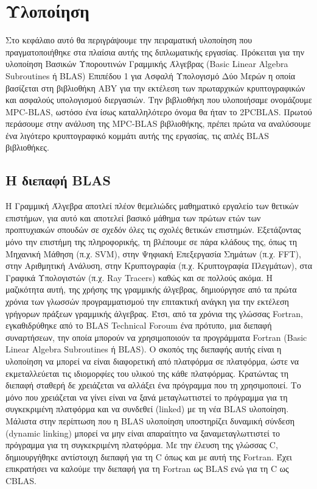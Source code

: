 \chapter{Υλοποίηση}
\label{chapter:implementation}

Στο κεφάλαιο αυτό θα περιγράψουμε την πειραματική υλοποίηση που πραγματοποιήθηκε στα πλαίσια αυτής της διπλωματικής εργασίας. Πρόκειται για την υλοποίηση Βασικών Υπορουτινών Γραμμικής Άλγεβρας (Basic Linear Algebra Subroutines ή BLAS) Επιπέδου 1 για Ασφαλή Υπολογισμό Δύο Μερών η οποία βασίζεται στη βιβλιοθήκη ABY για την εκτέλεση των πρωταρχικών κρυπτογραφικών και ασφαλούς υπολογισμού διεργασιών. Την βιβλιοθήκη που υλοποιήσαμε ονομάζουμε MPC-BLAS, ωστόσο ένα ίσως καταλληλότερο όνομα θα ήταν το 2PCBLAS. Πρωτού περάσουμε στην ανάλυση της MPC-BLAS βιβλιοθήκης, πρέπει πρώτα να αναλύσουμε ένα λιγότερο κρυπτογραφικό κομμάτι αυτής της εργασίας, τις απλές BLAS βιβλιοθήκες.


\section{Η διεπαφή BLAS}

Η Γραμμική Άλγεβρα αποτλεί πλέον θεμελιώδες μαθηματικό εργαλείο των θετικών επιστήμων, για αυτό και αποτελεί βασικό μάθημα των πρώτων ετών των προπτυχιακών σπουδών σε σχεδόν όλες τις σχολές θετικών επιστημών. Εξετάζοντας μόνο την επιστήμη της πληροφορικής, τη βλέπουμε σε πάρα κλάδους της, όπως τη Μηχανική Μάθηση (π.χ. SVM), στην Ψηφιακή Επεξεργασία Σημάτων (π.χ. FFT), στην Αριθμητική Ανάλυση, στην Κρυπτογραφία (π.χ. Κρυπτογραφία Πλεγμάτων), στα Γραφικά Υπολογιστών (π.χ. Ray Tracers) καθώς και σε πολλούς ακόμα.
Η μαζικότητα αυτή, της χρήσης της γραμμικής άλγεβρας, δημιούργησε από τα πρώτα χρόνια των γλωσσών προγραμματισμού την επιτακτική ανάγκη για την εκτέλεση γρήγορων πράξεων γραμμικής άλγεβρας. Έτσι, από τα χρόνια της γλώσσας Fortran, εγκαθιδρύθηκε από το BLAS Technical Foroum ένα πρότυπο, μια διεπαφή συναρτήσεων, την οποία μπορούν να χρησιμοποιούν τα προγράμματα Fortran (Basic Linear Algebra Subroutines ή BLAS). Ο σκοπός της διεπαφής αυτής είναι η υλοποίηση να μπορεί να είναι διαφορετική
από πλατφόρμα σε πλατφόρμα, ώστε να εκμεταλλεύεται τις ιδιομορφίες του υλικού της κάθε πλατφόρμας. Κρατώντας τη διεπαφή σταθερή δε χρειάζεται να αλλάξει ένα πρόγραμμα που τη χρησιμοποιεί. Το μόνο που χρειάζεται να γίνει είναι να ξανά μεταγλωττιστεί το πρόγραμμα για τη συγκεκριμένη πλατφόρμα και να συνδεθεί (linked) με τη νέα BLAS υλοποίηση. Μάλιστα στην περίπτωση που η BLAS υλοποίηση υποστηρίζει δυναμική σύνδεση (dynamic linking) μπορεί να μην είναι απαραίτητο να ξαναμεταγλωττιστεί το πρόγραμμα για τη συγκεκριμένη πλατφόρμα. Με την έλευση της γλώσσας C, δημιουργήθηκε αντίστοιχη διεπαφή για τη C όπως και με αυτή της Fortran. Έχει επικρατήσει να καλούμε την διεπαφή για τη Fortran ως BLAS ενώ για τη C ως CBLAS.

